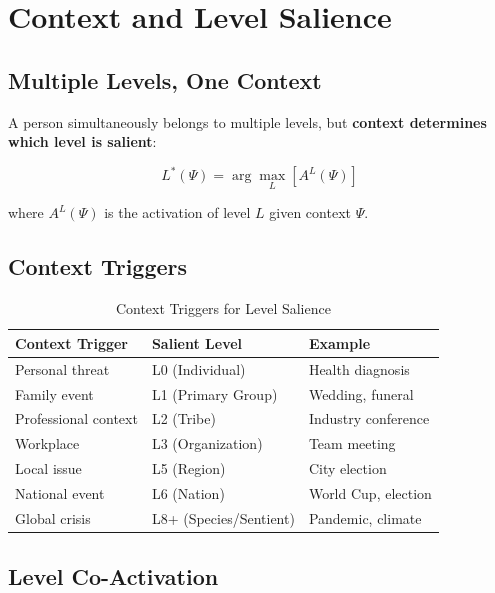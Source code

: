 \section{Context and Level Salience}
\label{sec:aaa-salience}

\subsection{Multiple Levels, One Context}

A person simultaneously belongs to multiple levels, but \textbf{context determines which level is salient}:

\begin{equation}
L^*(\Psi) = \arg\max_L \left[ A^L(\Psi) \right]
\end{equation}

where $A^L(\Psi)$ is the activation of level $L$ given context $\Psi$.

\subsection{Context Triggers}

\begin{table}[htbp]
\centering
\caption{Context Triggers for Level Salience}
\label{tab:aaa-triggers}
\renewcommand{\arraystretch}{1.3}
\begin{tabular}{@{}lll@{}}
\toprule
\textbf{Context Trigger} & \textbf{Salient Level} & \textbf{Example} \\
\midrule
Personal threat & L0 (Individual) & Health diagnosis \\
Family event & L1 (Primary Group) & Wedding, funeral \\
Professional context & L2 (Tribe) & Industry conference \\
Workplace & L3 (Organization) & Team meeting \\
Local issue & L5 (Region) & City election \\
National event & L6 (Nation) & World Cup, election \\
Global crisis & L8+ (Species/Sentient) & Pandemic, climate \\
\bottomrule
\end{tabular}
\end{table}

\subsection{Level Co-Activation}

